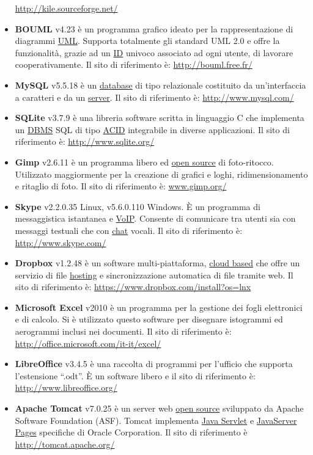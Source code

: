 \documentclass[a4paper,11pt]{article}
\begin{document}
\begin{itemize}
\url{http://kile.sourceforge.net/}
\item \textbf{BOUML} v4.23 \`e un programma grafico ideato per la rappresentazione di diagrammi \underline{UML}. Supporta totalmente gli standard UML 2.0 e offre la funzionalit\`a, grazie ad un \underline{ID} univoco associato ad ogni utente, di lavorare cooperativamente.  Il sito di riferimento \`e: 
\url{http://bouml.free.fr/}
\item \textbf{MySQL} v5.5.18 \`e un \underline{database} di tipo relazionale costituito da un'interfaccia a caratteri e da un \underline{server}. Il sito di riferimento \`e: \url{	http://www.mysql.com/}
\item \textbf{SQLite} v3.7.9 \`e una libreria software scritta in linguaggio C che implementa un \underline{DBMS} SQL di tipo \underline{ACID} integrabile in diverse applicazioni. Il sito di riferimento \`e:
\url{http://www.sqlite.org/}
\item \textbf{Gimp} v2.6.11 \`e un programma libero ed \underline{open source} di foto-ritocco. Utilizzato maggiormente per la creazione di grafici e loghi, ridimensionamento e ritaglio di foto. Il sito di riferimento \`e:
\url{www.gimp.org/}
\item \textbf{Skype} v2.2.0.35 Linux, v5.6.0.110 Windows. \`E un programma di messaggistica istantanea e \underline{VoIP}. Consente di comunicare tra utenti sia con messaggi testuali che con \underline{chat} vocali. Il sito di riferimento \`e: \url{http://www.skype.com/}
\item \textbf{Dropbox} v1.2.48  \`e un software multi-piattaforma, \underline{cloud based} che offre un servizio di file \underline{hosting} e sincronizzazione automatica di file tramite web. Il sito di riferimento \`e: \url{https://www.dropbox.com/install?os=lnx}
\item \textbf{Microsoft Excel} v2010 \`e un programma per la gestione dei fogli elettronici e di calcolo. Si \`e utilizzato questo software per disegnare istogrammi ed aerogrammi inclusi nei documenti. Il sito di riferimento \`e: \url{http://office.microsoft.com/it-it/excel/}
\item \textbf{LibreOffice} v3.4.5 \`e una raccolta di programmi per l'ufficio che supporta l'estensione ``.odt''. \`E un software libero e il sito di riferimento \`e: \url{http://www.libreoffice.org/}
\item \textbf{Apache Tomcat} v7.0.25 \`e un server web \underline{open source} sviluppato da Apache Software Foundation (ASF). Tomcat implementa \underline{Java Servlet} e \underline{JavaServer Pages} specifiche di Oracle Corporation.
Il sito di riferimento \`e \url{http://tomcat.apache.org/}
\end{itemize}
\end{document}
